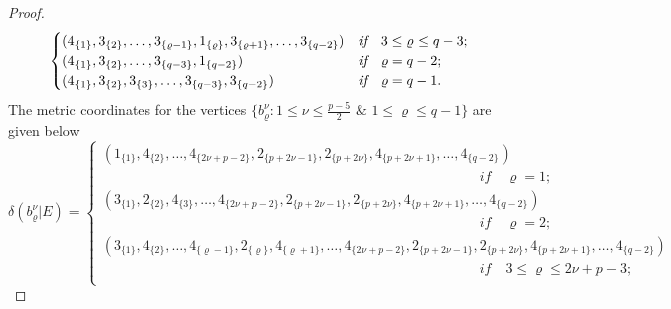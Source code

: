 \documentclass[]{interact}
\theoremstyle{plain}%
\theoremstyle{definition}
\theoremstyle{remark}
\begin{document}
\begin{proof}
\begin{equation*}
\begin{cases}
                    (4_{\{1\}},3_{\{2\}},\ldots,3_{\{\varrho -1\}},1_{\{ \varrho \}},3_{\{\varrho +1\}},\ldots,3_{\{q-2\}}) &\textit{if}\quad 3\leq \varrho $ $\leq q-3  ;\\
                    (4_{\{1\}},3_{\{2\}},\ldots,3_{\{q-3\}},1_{\{q-2\}}) &\textit{if}\quad \varrho= q-2;\\
                  
                    (4_{\{1\}},3_{\{2\}},3_{\{3\}},\ldots,3_{\{q-3\}},3_{\{q-2\}}) &\textit{if}\quad \varrho= q-1.\\
                \end{cases}
                     \end{equation*}
                     \noindent The metric coordinates for the vertices 
                     $\{b^\nu_\varrho:1\leq \nu\leq \frac{p-5}{2} $ $ \& $  $1\leq \varrho\leq q-1 \}$ are given below
                        \begin{equation*}
                        \delta(b^{\nu}_{\varrho}|E)=
                   \begin{cases}
                   (1_{\{1\}},4_{\{2\}},\ldots,4_{\{2\nu+p-2\}},2_{\{p+2\nu-1\}},2_{\{p+2\nu\}},4_{\{p+2\nu+1\}},\ldots,4_{\{q-2\}})\\ \qquad \qquad \qquad \qquad \qquad \qquad \qquad \qquad \qquad  \qquad \qquad\qquad\qquad\quad\textit{if}\quad\varrho= 1;\\
                    (3_{\{1\}},2_{\{2 \}},4_{\{3\}},\ldots,4_{\{2\nu+p-2\}},2_{\{p+2\nu-1\}},2_{\{p+2\nu\}},4_{\{p+2\nu+1\}},\ldots,4_{\{q-2\}})\\
\qquad \qquad \qquad \qquad \qquad \qquad \qquad \qquad \qquad  \qquad \qquad\qquad\qquad\quad\textit{if}\quad   \varrho= 2;\\
(3_{\{1\}},4_{\{2\}}, \ldots,4_{\{\varrho-1 \}},2_{\{ \varrho \}},4_{\{\varrho +1\}},\ldots,4_{\{2\nu+p-2\}},2_{\{p+2\nu-1\}},2_{\{p+2\nu\}},4_{\{p+2\nu+1\}},\ldots,4_{\{q-2\}})\\
\qquad \qquad \qquad \qquad \qquad \qquad \qquad \qquad \qquad  \qquad \qquad\qquad\qquad\quad\textit{if} \quad  3 \leq  \varrho  \leq 2\nu+p-3 ;\\


\end{cases}
\end{equation*}
\end{proof}
\end{document}
